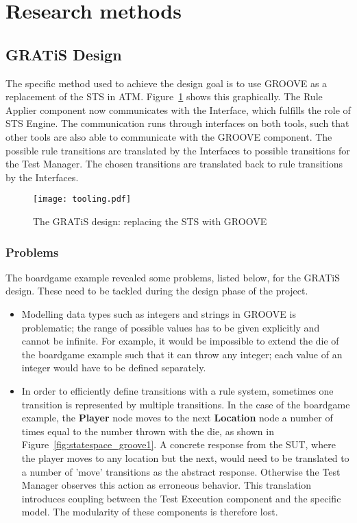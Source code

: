 \section{Research methods}\label{sec:research_methods}

\subsection{GRATiS Design}
The specific method used to achieve the design goal is to use GROOVE as a replacement of the STS in ATM. Figure~\ref{fig:tooling} shows this graphically. The Rule Applier component now communicates with the Interface, which fulfills the role of STS Engine. The communication runs through interfaces on both tools, such that other tools are also able to communicate with the GROOVE component. The possible rule transitions are translated by the Interfaces to possible transitions for the Test Manager. The chosen transitions are translated back to rule transitions by the Interfaces.

\begin{figure}[h]
  \begin{center}
    \texttt{[image: tooling.pdf]}
  \end{center}
  \caption{The GRATiS design: replacing the STS with GROOVE}
  \label{fig:tooling}
\end{figure}

\subsubsection{Problems}\label{sec:problems}
The boardgame example revealed some problems, listed below, for the GRATiS design. These need to be tackled during the design phase of the project. 
\begin{itemize}
  \item Modelling data types such as integers and strings in GROOVE is problematic; the range of possible values has to be given explicitly and cannot be infinite. For example, it would be impossible to extend the die of the boardgame example such that it can throw any integer; each value of an integer would have to be defined separately.
  \item In order to efficiently define transitions with a rule system, sometimes one transition is represented by multiple transitions. In the case of the boardgame example, the \textbf{Player} node moves to the next \textbf{Location} node a number of times equal to the number thrown with the die, as shown in Figure~\ref{fig:statespace_groove1}. A concrete response from the SUT, where the player moves to any location but the next, would need to be translated to a number of 'move' transitions as the abstract response. Otherwise the Test Manager observes this action as erroneous behavior. This translation introduces coupling between the Test Execution component and the specific model. The modularity of these components is therefore lost. %
\end{itemize}

